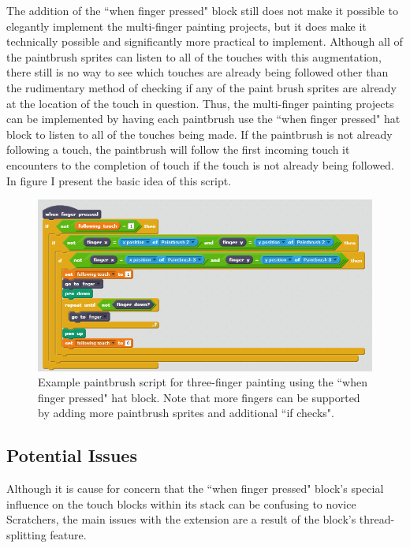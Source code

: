 The addition of the ``when finger pressed" block still does not make it possible to elegantly implement the multi-finger painting projects, but it does make it technically possible and significantly more practical to implement. Although all of the paintbrush sprites can listen to all of the touches with this augmentation, there still is no way to see which touches are already being followed other than the rudimentary method of checking if any of the paint brush sprites are already at the location of the touch in question. Thus, the multi-finger painting projects can be implemented by having each paintbrush use the ``when finger pressed" hat block to listen to all of the touches being made. If the paintbrush is not already following a touch, the paintbrush will follow the first incoming touch it encounters to the completion of touch if the touch is not already being followed. In figure I present the basic idea of this script.

\begin{figure}
\centering
\includegraphics[width=1.0\textwidth]{images/MultiFingerPaintingCFD.PNG}
\caption{Example paintbrush script for three-finger painting using the ``when finger pressed" hat block. Note that more fingers can be supported by adding more paintbrush sprites and additional ``if checks".}
\label{MultiFingerPaintingCFD}
\end{figure}

\subsection{Potential Issues}
Although it is cause for concern that the ``when finger pressed" block's special influence on the touch blocks within its stack can be confusing to novice Scratchers, the main issues with the extension are a result of the block's thread-splitting feature.

